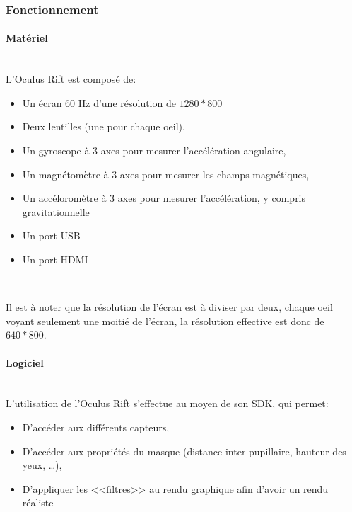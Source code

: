 \documentclass[a4paper,french,12pt]{article}
\begin{document}
		  \subsubsection{Fonctionnement}
		  
			\paragraph{Matériel} ~\\
		    
				L'Oculus Rift est composé de:\\
			      
				\begin{itemize}
				\item Un écran 60 Hz d'une résolution de $1280*800$
				\item Deux lentilles (une pour chaque oeil),
				\item Un gyroscope à 3 axes pour mesurer l'accélération angulaire,
				\item Un magnétomètre à 3 axes pour mesurer les champs magnétiques,
				\item Un accéloromètre à 3 axes pour mesurer l'accélération, y compris gravitationnelle
				\item Un port USB
				\item Un port HDMI
				\end{itemize} ~
			       
				Il est à noter que la résolution de l'écran est à diviser par deux, chaque oeil voyant seulement
				une moitié de l'écran, la résolution effective est donc de $640*800$.
		    
			\paragraph{Logiciel} ~\\
			    L'utilisation de l'Oculus Rift s'effectue au moyen de son SDK, qui permet:\\
			    
			    \begin{itemize}
			     \item D'accéder aux différents capteurs,
			     \item D'accéder aux propriétés du masque (distance inter-pupillaire, hauteur des yeux, \ldots),
			     \item D'appliquer les <<filtres>> au rendu graphique afin d'avoir un rendu réaliste
			    \end{itemize} ~
			    
\end{document}
